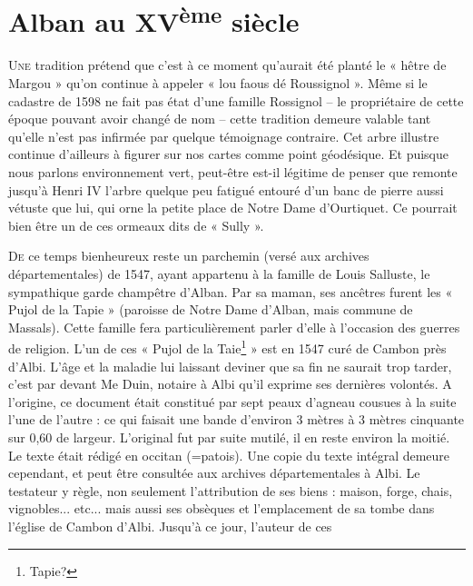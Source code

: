 
\section*{Alban au XV\textsuperscript{ème} siècle}

\lettrine{U}{ne} tradition prétend que c'est à ce moment qu'aurait été
planté le « hêtre de Margou » qu'on continue à appeler
« lou faous dé Roussignol ». Même si le cadastre de 1598 ne
fait pas état d'une famille Rossignol -- le propriétaire de
cette époque pouvant avoir changé de nom -- cette tradition
demeure valable tant qu'elle n'est pas infirmée par quelque
témoignage contraire. Cet arbre illustre continue d'ailleurs
à figurer sur nos cartes comme point géodésique. Et puisque
nous parlons environnement vert, peut-être est-il légitime
de penser que remonte jusqu'à Henri IV l'arbre quelque peu
fatigué entouré d'un banc de pierre aussi vétuste que lui,
qui orne la petite place de Notre Dame d'Ourtiquet. Ce
pourrait bien être un de ces ormeaux dits de « Sully ».

\lettrine{D}{e} ce temps bienheureux reste un parchemin
(versé aux archives départementales) de 1547, ayant
appartenu à la famille de Louis Salluste, le sympathique
garde champêtre d'Alban. Par sa maman, ses ancêtres furent
les « Pujol de la Tapie » (paroisse de Notre Dame d'Alban,
mais commune de Massals). Cette famille fera
particulièrement parler d'elle à l'occasion des guerres de
religion. L'un de ces « Pujol de la Taie\footnote{Tapie?} » est en 1547 curé
de Cambon près d'Albi. L'âge et la maladie lui laissant
deviner que sa fin ne saurait trop tarder, c'est par devant
Me Duin, notaire à Albi qu'il exprime ses dernières volontés.
A l'origine, ce document était constitué par sept peaux
d'agneau cousues à la suite l'une de l'autre : ce qui faisait
une bande d'environ 3 mètres à 3 mètres cinquante sur
0,60 de largeur. L'original fut par suite mutilé, il en reste
environ la moitié. Le texte était rédigé en occitan
(=patois). Une copie du texte intégral demeure cependant,
et peut être consultée aux archives départementales à
Albi. Le testateur y règle, non seulement l'attribution de
ses biens : maison, forge, chais, vignobles... etc... mais
aussi ses obsèques et l'emplacement de sa tombe dans
l'église de Cambon d'Albi. Jusqu'à ce jour, l'auteur de ces
